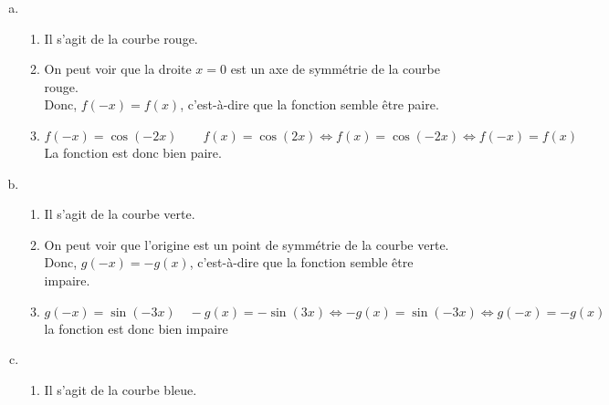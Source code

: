 \documentclass[12pt, a4paper]{article}
\begin{document}
\begin{Exercise}[number={80}]
\begin{center}
\end{center}
    \parbox{\linewidth}{}
    \begin{enumerate}[a)]
        \item   \begin{enumerate}[1)]
                    \item Il s'agit de la courbe rouge.
                    \item On peut voir que la droite $x=0$ est un axe de symmétrie de la courbe rouge. \\ Donc, $f(-x)=f(x)$, c'est-à-dire que la fonction semble être paire.
                    \item $f(-x)=\cos(-2x) \qquad f(x)=\cos(2x)\iff f(x)=\cos(-2x)\iff f(-x)=f(x)$ \\ La fonction est donc bien paire.
                \end{enumerate}\smallbreak
        \item   \begin{enumerate}[1)]
                    \item Il s'agit de la courbe verte.
                    \item On peut voir que l'origine est un point de symmétrie de la courbe verte. \\ Donc, $g(-x)=-g(x)$, c'est-à-dire que la fonction semble être impaire.
                    \item $g(-x)=\sin(-3x) \quad -g(x)=-\sin(3x)\iff -g(x)=\sin(-3x)\iff g(-x)=-g(x)$ \\ la fonction est donc bien impaire
                \end{enumerate}\smallbreak
        \item   \begin{enumerate}[1)]
                    \item Il s'agit de la courbe bleue.

\end{enumerate}
\end{enumerate}
\end{Exercise}
\end{document}
